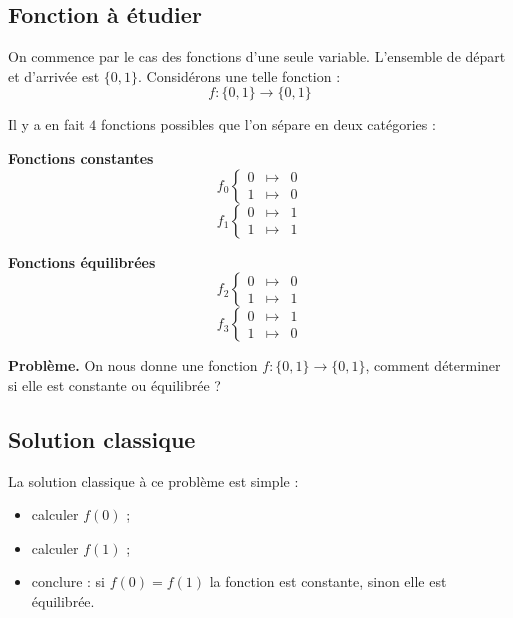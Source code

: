 \documentclass[11pt,class=report,crop=false]{standalone}
\begin{document}
\subsection{Fonction à étudier}

On commence par le cas des fonctions d'une seule variable.
L'ensemble de départ et d'arrivée est $\{0,1\}$.
Considérons une telle fonction :
$$f : \{0,1\} \longrightarrow \{0,1\}$$

Il y a en fait $4$ fonctions possibles que l'on sépare en deux catégories :

\begin{minipage}{0.45\textwidth}
\center
\textbf{Fonctions constantes}
$$f_0 \left\{\begin{array}{rcl}0&\mapsto&0\\1&\mapsto&0\end{array}\right.$$
$$f_1 \left\{\begin{array}{rcl}0&\mapsto&1\\1&\mapsto&1\end{array}\right.$$
\end{minipage}
\begin{minipage}{0.45\textwidth}
\center
\textbf{Fonctions équilibrées}
$$f_2 \left\{\begin{array}{rcl}0&\mapsto&0\\1&\mapsto&1\end{array}\right.$$
$$f_3 \left\{\begin{array}{rcl}0&\mapsto&1\\1&\mapsto&0\end{array}\right.$$
\end{minipage}

\textbf{Problème.}
On nous donne une fonction $f : \{0,1\} \longrightarrow \{0,1\}$, comment déterminer si elle est constante ou équilibrée ?


\subsection{Solution classique}

La solution classique à ce problème est simple :
\begin{itemize}
  \item calculer $f(0)$ ;
  \item calculer $f(1)$ ;
  \item conclure : si $f(0)=f(1)$ la fonction est constante, sinon elle est équilibrée.
\end{itemize}
\end{document}
